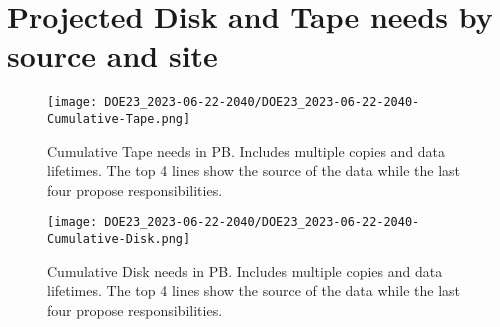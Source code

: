 \section{Projected Disk and Tape needs by source and site}
\begin{figure}[h]
\centering\texttt{[image: DOE23\_2023-06-22-2040/DOE23\_2023-06-22-2040-Cumulative-Tape.png]}
\caption{Cumulative Tape needs in PB. Includes multiple copies and data lifetimes. The top 4 lines show the source of the data while the last four propose responsibilities.}
\label{fig:Cumulative-Tape}
\end{figure}
\begin{figure}[h]
\centering\texttt{[image: DOE23\_2023-06-22-2040/DOE23\_2023-06-22-2040-Cumulative-Disk.png]}
\caption{Cumulative Disk needs in PB. Includes multiple copies and data lifetimes. The top 4 lines show the source of the data while the last four propose responsibilities.}
\label{fig:Cumulative-Disk}
\end{figure}
